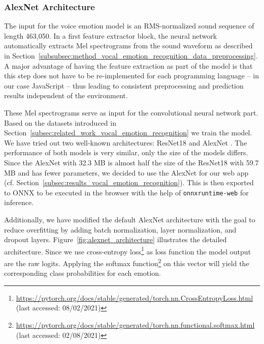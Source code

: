\subsubsection{AlexNet Architecture}
\label{subsubsec:method_vocal_emotion_recognition_alexnet_architecture}
The input for the voice emotion model is an RMS-normalized sound sequence of length 463,050. In a first feature extractor block, the neural network automatically extracts Mel spectrograms from the sound waveform as described in Section~\ref{subsubsec:method_vocal_emotion_recognition_data_preprocessing}. A major advantage of having the feature extraction as part of the model is that this step does not have to be re-implemented for each programming language -- in our case JavaScript -- thus leading to consistent preprocessing and prediction results independent of the environment.

These Mel spectrograms serve as input for the convolutional neural network part. Based on the datasets introduced in Section~\ref{subsec:related_work_vocal_emotion_recognition} we train the model. We have tried out two well-known architectures: ResNet18 and AlexNet \cite{krizhevsky_imagenet_2012,he_deep_2015}. The performance of both models is very similar, only the size of the models differs. Since the AlexNet with 32.3 MB is almost half the size of the ResNet18 with 59.7 MB and has fewer parameters, we decided to use the AlexNet for our web app (cf. Section~\ref{subsec:results_vocal_emotion_recognition}). This is then exported to ONNX to be executed in the browser with the help of \texttt{onnxruntime-web} for inference.

Additionally, we have modified the default AlexNet architecture with the goal to reduce overfitting by adding batch normalization, layer normalization, and dropout layers. Figure~\ref{fig:alexnet_architecture} illustrates the detailed architecture. Since we use cross-entropy loss\footnote{\url{https://pytorch.org/docs/stable/generated/torch.nn.CrossEntropyLoss.html} (last accessed: 08/02/2021)} as loss function the model output are the raw logits. Applying the softmax function\footnote{\url{https://pytorch.org/docs/stable/generated/torch.nn.functional.softmax.html} (last accessed: 02/08/2021)} on this vector will yield the corresponding class probabilities for each emotion.

